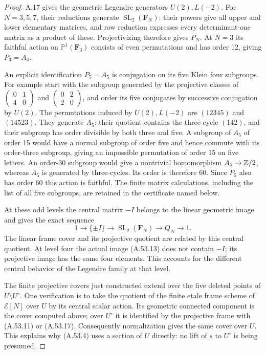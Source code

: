 \begin{proof}
A.17 gives the geometric Legendre generators $U(2),L(-2)$.
For $N=3,5,7$, their reductions generate
$\operatorname{SL}_2(\mathbf F_N)$: their powers give all upper
and lower elementary matrices, and row reduction expresses every
determinant-one matrix as a product of these.  Projectivizing
therefore gives $P_N$.  At $N=3$ its faithful action on
$\mathbb P^1(\mathbf F_3)$ consists of even permutations and has
order 12, giving $P_3=A_4$.

An explicit identification $P_5=A_5$ is conjugation on its five
Klein four subgroups.  For example start with the subgroup
generated by the projective classes of
$\left(\begin{smallmatrix}0&1\\4&0\end{smallmatrix}\right)$ and
$\left(\begin{smallmatrix}0&2\\2&0\end{smallmatrix}\right)$,
and order its five conjugates by successive conjugation by
$U(2)$.  The permutations induced by $U(2),L(-2)$ are
$(12345)$ and $(14523)$.  They generate $A_5$: their quotient
contains the three-cycle $(142)$, and their subgroup has order
divisible by both three and five.  A subgroup of $A_5$ of order
15 would have a normal subgroup of order five and hence commute
with its order-three subgroup, giving an impossible permutation
of order 15 on five letters.  An order-30 subgroup would give
a nontrivial homomorphism $A_5\to\mathbb Z/2$, whereas $A_5$ is generated
by three-cycles.  Its order is therefore 60.  Since $P_5$ also
has order 60 this action is faithful.  The finite matrix
calculations, including the list of all five subgroups, are
retained in the certificate named below.

At these odd levels the central matrix $-I$ belongs to the linear
geometric image and gives the exact sequence
\[
 1\longrightarrow\{\pm I\}\longrightarrow
 \operatorname{SL}_2(\mathbf F_N)\longrightarrow Q_N
 \longrightarrow1.
\tag{A.53.19}
\]
The linear frame cover and its projective quotient are related by
this central quotient.  At level four the actual image
(A.53.13) does not contain $-I$; its projective image has the
same four elements.  This accounts for the different central
behavior of the Legendre family at that level.

The finite projective covers just constructed extend over the
five deleted points of $U\setminus U^\circ$.  One verification is
to take the quotient of the finite etale frame scheme of
$\mathcal E[N]$ over $U$ by its central scalar action.  Its
geometric connected component is the cover computed above;
over $U^\circ$ it is identified by the projective frame with
(A.53.11) or (A.53.17).  Consequently normalization gives the
same cover over $U$.  This explains why (A.53.4) uses a section
of $U$ directly: no lift of $s$ to $U^\circ$ is being presumed.


\end{proof}
